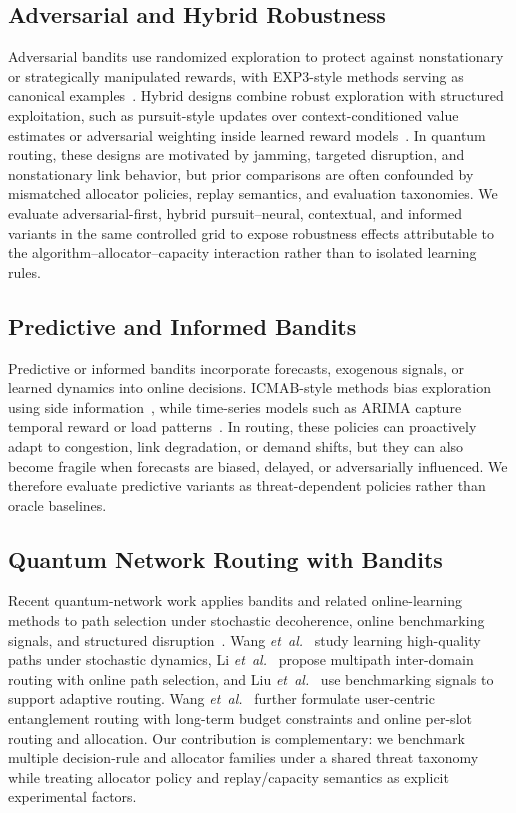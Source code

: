 \documentclass[10pt,conference]{IEEEtran}
\newcommand{\etal}{\emph{et~al.}\xspace}
\begin{document}
\subsection{Adversarial and Hybrid Robustness}

Adversarial bandits use randomized exploration to protect against nonstationary or strategically manipulated rewards, with EXP3-style methods serving as canonical examples~\cite{auer2002nonstochastic}. Hybrid designs combine robust exploration with structured exploitation, such as pursuit-style updates over context-conditioned value estimates or adversarial weighting inside learned reward models~\cite{thathachar2011networks}. In quantum routing, these designs are motivated by jamming, targeted disruption, and nonstationary link behavior, but prior comparisons are often confounded by mismatched allocator policies, replay semantics, and evaluation taxonomies. We evaluate adversarial-first, hybrid pursuit--neural, contextual, and informed variants in the same controlled grid to expose robustness effects attributable to the algorithm--allocator--capacity interaction rather than to isolated learning rules.

\subsection{Predictive and Informed Bandits}

Predictive or informed bandits incorporate forecasts, exogenous signals, or learned dynamics into online decisions. ICMAB-style methods bias exploration using side information~\cite{kar2024icmab}, while time-series models such as ARIMA capture temporal reward or load patterns~\cite{box2015time}. In routing, these policies can proactively adapt to congestion, link degradation, or demand shifts, but they can also become fragile when forecasts are biased, delayed, or adversarially influenced. We therefore evaluate predictive variants as threat-dependent policies rather than oracle baselines.

\subsection{Quantum Network Routing with Bandits}

Recent quantum-network work applies bandits and related online-learning methods to path selection under stochastic decoherence, online benchmarking signals, and structured disruption~\cite{wehner2018quantum,huang2024quantum,wang2025learning,li2025multipath,liu2024qbgp}. Wang \etal~\cite{wang2025learning} study learning high-quality paths under stochastic dynamics, Li \etal~\cite{li2025multipath} propose multipath inter-domain routing with online path selection, and Liu \etal~\cite{liu2024qbgp} use benchmarking signals to support adaptive routing. Wang \etal~\cite{wang2024adaptive} further formulate user-centric entanglement routing with long-term budget constraints and online per-slot routing and allocation. Our contribution is complementary: we benchmark multiple decision-rule and allocator families under a shared threat taxonomy while treating allocator policy and replay/capacity semantics as explicit experimental factors.
\end{document}
